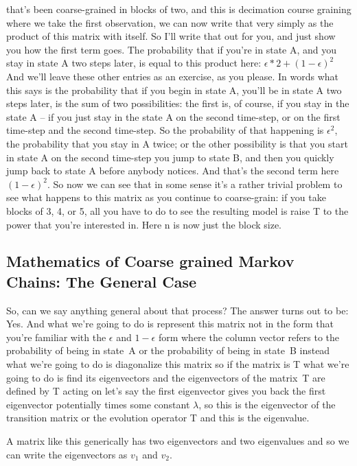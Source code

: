 \documentclass[]{article}
\begin{document}
that’s been coarse-grained
in blocks of two,
and this is decimation course graining
where we take the first observation,
we can now write that very simply
as the product of this matrix with itself.
So I'll write that out for you,
and just show you how the first term goes.
The probability that if you’re in state A,
and you stay in state A two steps later,
is equal to this product here:
$\epsilon*2 + (1-\epsilon)^2$
And we’ll leave these other entries
as an exercise, as you please.
In words what this says
is the probability
that if you begin in state A,
you’ll be in state A two steps later,
is the sum of two possibilities:
the first is, of course,
if you stay in the state A –
if you just stay in the state A
on the second time-step,
or on the first time-step
and the second time-step.
So the probability
of that happening is $\epsilon^2$,
the probability that you stay in A twice;
or the other possibility
is that you start in state A
on the second time-step
you jump to state B,
and then you quickly jump back
to state A before anybody notices.
And that’s the second term here $(1-\epsilon)^2$.
So now we can see that in some sense
it’s a rather trivial problem
to see what happens to this matrix
as you continue to coarse-grain:
if you take blocks of 3, 4, or 5,
all you have to do
to see the resulting model
is raise T to the power
that you’re interested in.
Here n is now just the block size.

\subsection{Mathematics of Coarse grained Markov Chains: The General Case }

So, can we say anything
general about that process?
The answer turns out to be: Yes.
And what we're going to do
is represent this matrix
not in the form
that you're familiar with
the $\epsilon$ and $1-\epsilon$ form
where the column vector refers to
the probability of being in state A
or the probability of being in state B
instead what we're going to do is
diagonalize this matrix
so if the matrix is T what we're
going to do is find its eigenvectors
and the eigenvectors
of the matrix T are defined
by T acting on let's say
the first eigenvector
gives you back the first eigenvector
potentially times some constant $\lambda$,
so this is the eigenvector
of the transition matrix or
the evolution operator T
and this is the eigenvalue.

A matrix like this generically has two
eigenvectors
and two
eigenvalues
and so we can write the eigenvectors
as $v_1$ and $v_2$.
\end{document}
